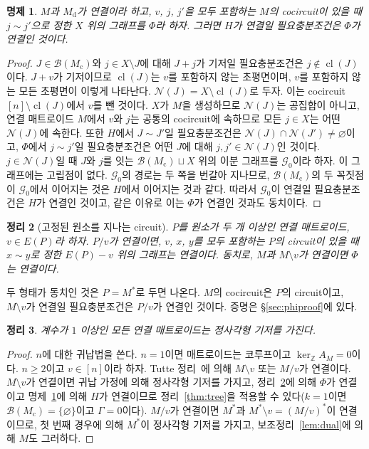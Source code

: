 \documentclass[11pt,a4paper]{article}
\theoremstyle{plain}
\newtheorem{theorem}{정리}[section]
\newtheorem{proposition}[theorem]{명제}
\theoremstyle{definition}
\newcommand{\Z}{\mathbb Z}
\newcommand{\kerZ}{\ker_{\Z}\!A_M}
\newcommand{\bs}{\mathcal B}
\newcommand{\cl}{\operatorname{cl}}
\begin{document}
\begin{proposition}\label{prop:phi}
$M$과 $M_{\mathrm d}$가 연결이라 하고, $v$, $j$, $j'$을 모두 포함하는 $M$의 cocircuit이 있을 때 $j\sim j'$으로 정한 $X$ 위의 그래프를 $\Phi$라 하자. 그러면 $H$가 연결일 필요충분조건은 $\Phi$가 연결인 것이다.
\end{proposition}
\begin{proof}
$J\in\bs(M_{\mathrm c})$와 $j\in X\setminus J$에 대해 $J+j$가 기저일 필요충분조건은 $j\notin\cl(J)$이다. $J+v$가 기저이므로 $\cl(J)$는 $v$를 포함하지 않는 초평면이며, $v$를 포함하지 않는 모든 초평면이 이렇게 나타난다. $\mathcal N(J)=X\setminus\cl(J)$로 두자. 이는 cocircuit $[n]\setminus\cl(J)$에서 $v$를 뺀 것이다. $X$가 $M$을 생성하므로 $\mathcal N(J)$는 공집합이 아니고, 연결 매트로이드 $M$에서 $v$와 $j$는 공통의 cocircuit에 속하므로 모든 $j\in X$는 어떤 $\mathcal N(J)$에 속한다. 또한 $H$에서 $J\sim J'$일 필요충분조건은 $\mathcal N(J)\cap\mathcal N(J')\ne\varnothing$이고, $\Phi$에서 $j\sim j'$일 필요충분조건은 어떤 $J$에 대해 $j,j'\in\mathcal N(J)$인 것이다. $j\in\mathcal N(J)$일 때 $J$와 $j$를 잇는 $\bs(M_{\mathrm c})\sqcup X$ 위의 이분 그래프를 $\mathcal G_0$이라 하자. 이 그래프에는 고립점이 없다. $\mathcal G_0$의 경로는 두 쪽을 번갈아 지나므로, $\bs(M_{\mathrm c})$의 두 꼭짓점이 $\mathcal G_0$에서 이어지는 것은 $H$에서 이어지는 것과 같다. 따라서 $\mathcal G_0$이 연결일 필요충분조건은 $H$가 연결인 것이고, 같은 이유로 이는 $\Phi$가 연결인 것과도 동치이다.
\end{proof}

\begin{theorem}[고정된 원소를 지나는 circuit]\label{thm:phi}
$P$를 원소가 두 개 이상인 연결 매트로이드, $v\in E(P)$라 하자. $P/v$가 연결이면, $v$, $x$, $y$를 모두 포함하는 $P$의 circuit이 있을 때 $x\sim y$로 정한 $E(P)-v$ 위의 그래프는 연결이다. 동치로, $M$과 $M\setminus v$가 연결이면 $\Phi$는 연결이다.
\end{theorem}
두 형태가 동치인 것은 $P=M^*$로 두면 나온다. $M$의 cocircuit은 $P$의 circuit이고, $M\setminus v$가 연결일 필요충분조건은 $P/v$가 연결인 것이다. 증명은 \S\ref{sec:phiproof}에 있다.

\begin{theorem}\label{thm:cond}
계수가 $1$ 이상인 모든 연결 매트로이드는 정사각형 기저를 가진다.
\end{theorem}
\begin{proof}
$n$에 대한 귀납법을 쓴다. $n=1$이면 매트로이드는 코루프이고 $\kerZ=0$이다. $n\ge2$이고 $v\in[n]$이라 하자. Tutte 정리~\cite[\S4.3]{Ox11}에 의해 $M\setminus v$ 또는 $M/v$가 연결이다. $M\setminus v$가 연결이면 귀납 가정에 의해 정사각형 기저를 가지고, 정리~\ref{thm:phi}에 의해 $\Phi$가 연결이고 명제~\ref{prop:phi}에 의해 $H$가 연결이므로 정리~\ref{thm:tree}을 적용할 수 있다($k=1$이면 $\bs(M_{\mathrm c})=\{\varnothing\}$이고 $\Gamma=0$이다). $M/v$가 연결이면 $M^*$과 $M^*\setminus v=(M/v)^*$이 연결이므로, 첫 번째 경우에 의해 $M^*$이 정사각형 기저를 가지고, 보조정리~\ref{lem:dual}에 의해 $M$도 그러하다.
\end{proof}
\end{document}

